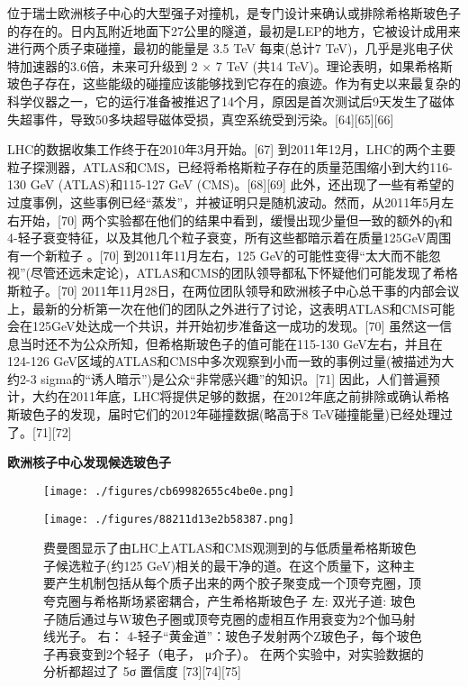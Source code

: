 位于瑞士欧洲核子中心的大型强子对撞机，是专门设计来确认或排除希格斯玻色子的存在的。日内瓦附近地面下27公里的隧道，最初是LEP的地方，它被设计成用来进行两个质子束碰撞，最初的能量是 3.5 TeV 每束(总计7 TeV)，几乎是兆电子伏特加速器的3.6倍，未来可升级到 2 × 7 TeV (共14 TeV)。理论表明，如果希格斯玻色子存在，这些能级的碰撞应该能够找到它存在的痕迹。作为有史以来最复杂的科学仪器之一，它的运行准备被推迟了14个月，原因是首次测试后9天发生了磁体失超事件，导致50多块超导磁体受损，真空系统受到污染。[64][65][66]

LHC的数据收集工作终于在2010年3月开始。[67] 到2011年12月，LHC的两个主要粒子探测器，ATLAS和CMS，已经将希格斯粒子存在的质量范围缩小到大约116-130 GeV (ATLAS)和115-127 GeV (CMS)。[68][69] 此外，还出现了一些有希望的过度事例，这些事例已经“蒸发”，并被证明只是随机波动。然而，从2011年5月左右开始，[70] 两个实验都在他们的结果中看到，缓慢出现少量但一致的额外的γ和4-轻子衰变特征，以及其他几个粒子衰变，所有这些都暗示着在质量125GeV周围有一个新粒子 。[70] 到2011年11月左右，125 GeV的可能性变得“太大而不能忽视”(尽管还远未定论)，ATLAS和CMS的团队领导都私下怀疑他们可能发现了希格斯粒子。[70] 2011年11月28日，在两位团队领导和欧洲核子中心总干事的内部会议上，最新的分析第一次在他们的团队之外进行了讨论，这表明ATLAS和CMS可能会在125GeV处达成一个共识，并开始初步准备这一成功的发现。[70] 虽然这一信息当时还不为公众所知，但希格斯玻色子的值可能在115-130 GeV左右，并且在124-126 GeV区域的ATLAS和CMS中多次观察到小而一致的事例过量(被描述为大约2-3 sigma的“诱人暗示”)是公众“非常感兴趣”的知识。[71] 因此，人们普遍预计，大约在2011年底，LHC将提供足够的数据，在2012年底之前排除或确认希格斯玻色子的发现，届时它们的2012年碰撞数据(略高于8 TeV碰撞能量)已经处理过了。[71][72]

\textbf{欧洲核子中心发现候选玻色子}
\begin{figure}[ht]
\centering
\texttt{[image: ./figures/cb69982655c4be0e.png]}
\caption \label{fig_Higgs_5}
\end{figure}
\begin{figure}[ht]
\centering
\texttt{[image: ./figures/88211d13e2b58387.png]}
\caption{费曼图显示了由LHC上ATLAS和CMS观测到的与低质量希格斯玻色子候选粒子(约125 GeV)相关的最干净的道。在这个质量下，这种主要产生机制包括从每个质子出来的两个胶子聚变成一个顶夸克圈，顶夸克圈与希格斯场紧密耦合，产生希格斯玻色子 左: 双光子道: 玻色子随后通过与W玻色子圈或顶夸克圈的虚相互作用衰变为2个伽马射线光子。 右： 4-轻子“黄金道”：玻色子发射两个Z玻色子，每个玻色子再衰变到2个轻子（电子， μ介子）。 在两个实验中，对实验数据的分析都超过了 5σ 置信度 [73][74][75]} \label{fig_Higgs_6}
\end{figure}

